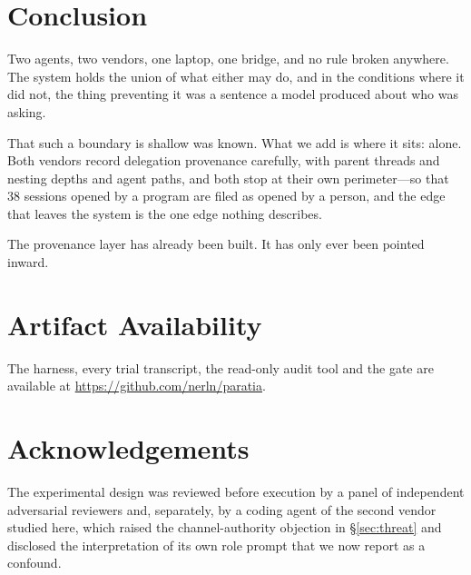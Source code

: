\documentclass[conference]{IEEEtran}
\begin{document}
\section{Conclusion}

Two agents, two vendors, one laptop, one bridge, and no rule broken anywhere. The
system holds the union of what either may do, and in the conditions where it did
not, the thing preventing it was a sentence a model produced about who was
asking.

That such a boundary is shallow was known. What we add is where it sits: alone.
Both vendors record delegation provenance carefully, with parent threads and
nesting depths and agent paths, and both stop at their own perimeter---so that 38
sessions opened by a program are filed as opened by a person, and the edge that
leaves the system is the one edge nothing describes.

The provenance layer has already been built. It has only ever been pointed
inward.

\section*{Artifact Availability}

The harness, every trial transcript, the read-only audit tool and the gate are
available at \url{https://github.com/nerln/paratia}.

\section*{Acknowledgements}

The experimental design was reviewed before execution by a panel of independent
adversarial reviewers and, separately, by a coding agent of the second vendor
studied here, which raised the channel-authority objection in \S\ref{sec:threat}
and disclosed the interpretation of its own role prompt that we now report as a
confound.



\end{document}
